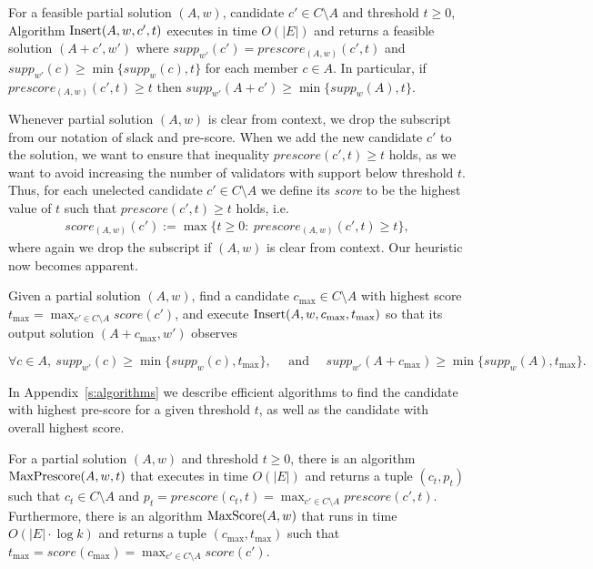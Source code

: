 \begin{lemma}\label{lem:insert}
For a feasible partial solution $(A,w)$, candidate $c'\in C\setminus A$ and threshold $t\geq 0$, 
Algorithm $\operatorname{Insert}(A,w,c',t)$ executes in time $O(|E|)$ and returns a feasible solution $(A+c',w')$ 
where $supp_{w'}(c')=prescore_{(A,w)}(c',t)$ and $supp_{w'}(c)\geq \min\{supp_w(c),t\}$ for each member $c\in A$. 
In particular, if $prescore_{(A,w)}(c',t)\geq t$ then $supp_{w'}(A+c')\geq \min\{supp_w(A),t\}$.
\end{lemma}

Whenever partial solution $(A,w)$ is clear from context, we drop the subscript from our notation of slack and pre-score. 
When we add the new candidate $c'$ to the solution, we want to ensure that inequality $prescore(c',t)\geq t$ holds, as we want to avoid increasing the number of validators with support below threshold $t$. 
Thus, for each unelected candidate $c'\in C\setminus A$ we define its \emph{score} to be the highest value of $t$ such that $prescore(c',t) \geq t$ holds, i.e. 
%
\begin{align}
    score_{(A,w)}(c'):=\max\{t\geq 0: \ prescore_{(A,w)}(c',t)\geq t\},
\end{align}
%
where again we drop the subscript if $(A,w)$ is clear from context. Our heuristic now becomes apparent.

\begin{heuristic}[$\phragmms$]
Given a partial solution $(A,w)$, find a candidate $c_{\max}\in C\setminus A$ with highest score $t_{\max}=\max_{c'\in C\setminus A} score(c')$, and execute $\operatorname{Insert}(A,w,c_{\max},t_{\max})$ so that its output solution $(A+c_{\max},w')$ observes 

$$\forall c\in A, \ supp_{w'}(c)\geq \min\{supp_w(c), t_{\max}\}, \quad \text{ and } \quad supp_{w'}(A+c_{\max})\geq \min \Big\{ supp_w(A), t_{\max}\Big\}.$$
\end{heuristic}

In Appendix~\ref{s:algorithms} we describe efficient algorithms to find the candidate with highest pre-score for a given threshold $t$, as well as the candidate with overall highest score.

\begin{theorem}\label{thm:runtimes}
For a partial solution $(A,w)$ and threshold $t\geq 0$, there is an algorithm $\operatorname{MaxPrescore}(A,w,t)$ that executes in time $O(|E|)$ and returns a tuple $(c_t,p_t)$ such that $c_t\in C\setminus A$ and $p_t=prescore(c_t,t)=\max_{c'\in C\setminus A} prescore(c',t)$.
Furthermore, there is an algorithm $\operatorname{MaxScore}(A,w)$ that runs in time $O(|E|\cdot \log k)$ and returns a tuple $(c_{\max}, t_{\max})$ such that $t_{\max}=score(c_{\max})=\max_{c'\in C\setminus A} score(c')$.
\end{theorem}


